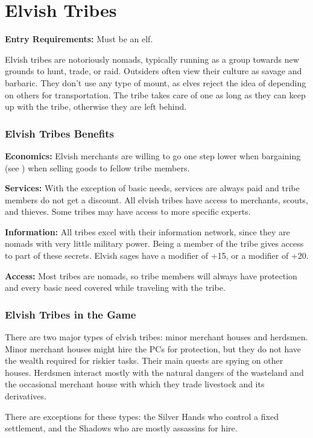 \section{Elvish Tribes}

\textbf{Entry Requirements:} Must be an elf.

Elvish tribes are notoriously nomads, typically running as a group towards new grounds to hunt, trade, or raid. Outsiders often view their culture as savage and barbaric. They don't use any type of mount, as elves reject the idea of depending on others for transportation. The tribe takes care of one as long as they can keep up with the tribe, otherwise they are left behind.

\subsubsection{Elvish Tribes Benefits}
\textbf{Economics:} Elvish merchants are willing to go one step lower when bargaining (see ) when selling goods to fellow tribe members.

\textbf{Services:} With the exception of basic needs, services are always paid and tribe members do not get a discount. All elvish tribes have access to merchants, scouts, and thieves. Some tribes may have access to more specific experts.

\textbf{Information:} All tribes excel with their information network, since they are nomads with very little military power. Being a member of the tribe gives access to part of these secrets. Elvish sages have a  modifier of +15, or a  modifier of +20.

\textbf{Access:} Most tribes are nomads, so tribe members will always have protection and every basic need covered while traveling with the tribe.

\subsubsection{Elvish Tribes in the Game}
There are two major types of elvish tribes: minor merchant houses and herdsmen. Minor merchant houses might hire the PCs for protection, but they do not have the wealth required for riskier tasks. Their main quests are spying on other houses. Herdsmen interact mostly with the natural dangers of the wasteland and the occasional merchant house with which they trade livestock and its derivatives.

There are exceptions for these types: the Silver Hands who control a fixed settlement, and the Shadows who are mostly assassins for hire.

